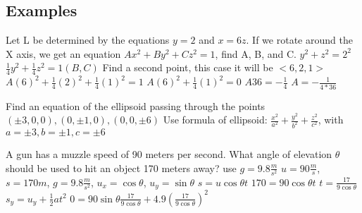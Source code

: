 \documentclass[12pt]{article}
\begin{document}
\begin{paracol}{2}
        \section*{Examples}
        \begin{fleqn}
            Let L be determined by the equations $y=2$ and $x=6z$. If we rotate around the X axis, we get an equation
            \newline
            $Ax^2 + By^2 + Cz^2 = 1$, find A, B, and C.\newline
            $y^2 + z^2 = 2^2$ \guillemotright $\frac{1}{4}y^2 + \frac{1}{4}z^2 = 1  (B,C)$ \newline
            Find a second point, this case it will be $<6,2,1>$ \newline
            $A(6)^2 + \frac{1}{4}(2)^2 + \frac{1}{4}(1)^2 = 1$ \guillemotright $A(6)^2 + \frac{1}{4}(1)^2 = 0$ \newline
            $A36 = - \frac{1}{4}$ \guillemotright $A = - \frac{1}{4*36}$ \newline
        \end{fleqn}
        \newline
        \begin{fleqn}
            Find an equation of the ellipsoid passing through the points \newline
            $(\pm3,0,0),(0,\pm1,0),(0,0,\pm6) $ \newline
            Use formula of ellipsoid: $\frac{x^2}{a^2} + \frac{y^2}{b^2} + \frac{z^2}{c^2}$, with $a=\pm3, b=\pm1, c=\pm 6$
        \end{fleqn}
        \newline
        \newline
        \newline
        \switchcolumn
        \begin{fleqn}
            A gun has a muzzle speed of 90 meters per second. What angle of elevation $\theta$ should be used to hit an object
            170 meters away? use $g=9.8 \frac{m}{s^2}$ \newline
            $u=90\frac{m}{s}$, $s=170m$, $g=9.8\frac{m}{s^2}$, $u_x=\cos\theta$, $u_y=\sin\theta$ \newline
            $s = u\cos\theta t$ \guillemotright
            $170=90\cos\theta t$ \guillemotright
            $t=\frac{17}{9\cos\theta}$\newline
            $s_y=u_y + \frac{1}{2}at^2$ \guillemotright
            $0=90\sin\theta \frac{17}{9\cos\theta} + 4.9 (\frac{17}{9\cos\theta})^2$ \newline

\end{fleqn}
\end{paracol}
\end{document}

